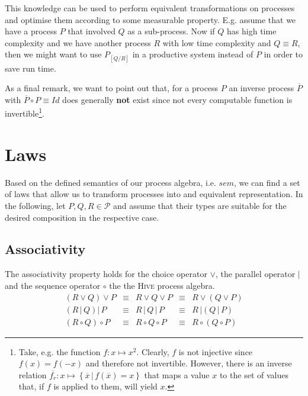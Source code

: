 This knowledge can be used to perform equivalent transformations on processes and optimise them according to some measurable property. E.g. assume that we have a process $P$ that involved $Q$ as a sub-process. Now if $Q$ has high time complexity and we have another process $R$ with low time complexity and $Q \equiv R$, then we might want to use $P_{\left[ Q / R \right]}$ in a productive system instead of $P$ in order to save run time.

As a final remark, we want to point out that, for a process $P$ an inverse process $\overline{P}$ with $\overline{P} \circ P \equiv Id$ does generally \textbf{not} exist since not every computable function is invertible\footnote{Take, e.g. the function $f \colon x \mapsto x^2$. Clearly, $f$ is not injective since $f \left( x \right) = f \left( -x \right)$ and therefore not invertible. However, there is an inverse relation $\overline{f_r} \colon x \mapsto \left\{ \overline{x} \,|\, f \left( \overline{x} \right) = x \right\}$ that maps a value $x$ to the set of values that, if $f$ is applied to them, will yield $x$.}.

\section{Laws}
\label{chp:laws}
Based on the defined semantics of our process algebra, i.e. $sem$, we can find a set of laws that allow us to transform processes into and equivalent representation. In the following, let $P, Q, R \in \mathcal{P}$ and assume that their types are suitable for the desired composition in the respective case.

\subsection{Associativity}
The associativity property holds for the choice operator $\vee$, the parallel operator $|$ and the sequence operator $\circ$ the the \textsc{Hive} process algebra.
\begin{equation*}
\begin{array}{rcccl}
  \left( R \vee Q \right) \vee P & \equiv & R \vee Q \vee P & \equiv & R \vee \left( Q \vee P \right) \\
  \left( R \,|\, Q \right) |\, P & \equiv & R \,|\, Q \,|\, P & \equiv & R \,| \left( Q \,|\, P \right) \\
  \left( R \circ Q \right) \circ P & \equiv & R \circ Q \circ P & \equiv & R \circ \left( Q \circ P \right)
\end{array}
\end{equation*}

